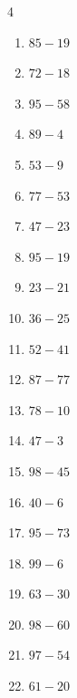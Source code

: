\begin{multicols}{4}
\begin{enumerate}
\columnbreak %

  \item $85-19$
        \phantom{$=66$}

  \item $72-18$
        \phantom{$=54$}

  \item $95-58$
        \phantom{$=37$}

  \item $89-4$
        \phantom{$=85$}

  \item $53-9$
        \phantom{$=44$}

  \item $77-53$
        \phantom{$=24$}

  \item $47-23$
        \phantom{$=24$}

  \item $95-19$
        \phantom{$=76$}

  \item $23-21$
        \phantom{$=2$}

  \item $36-25$
        \phantom{$=11$}

  \item $52-41$
        \phantom{$=11$}

  \item $87-77$
        \phantom{$=10$}

  \item $78-10$
        \phantom{$=68$}

  \item $47-3$
        \phantom{$=44$}

  \item $98-45$
        \phantom{$=53$}

  \item $40-6$
        \phantom{$=34$}

  \item $95-73$
        \phantom{$=22$}

  \item $99-6$
        \phantom{$=93$}

  \item $63-30$
        \phantom{$=33$}

  \item $98-60$
        \phantom{$=38$}

  \item $97-54$
        \phantom{$=43$}

  \item $61-20$
        \phantom{$=41$}


\end{enumerate}
\end{multicols}
